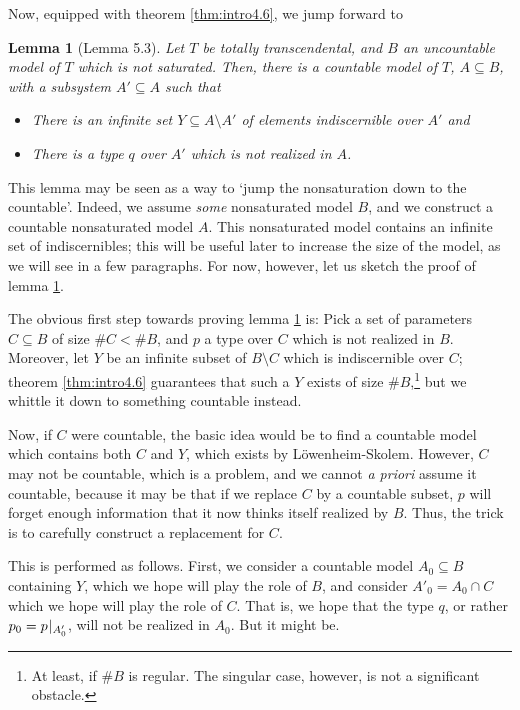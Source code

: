\documentclass{article}
\newtheorem{lemma}[theorem]{Lemma}
\theoremstyle{nonumberplain}
\newcommand{\card}[1]{\#{#1}}
\newcommand{\rst}[2]{#1\mspace{1.3mu plus 0.5mu minus 0.5mu}|_{#2}}
\begin{document}
Now, equipped with theorem \ref{thm:intro4.6}, we jump forward to
\begin{lemma}[Lemma 5.3]\label{lem:intro5.3}
Let $T$ be totally transcendental, and $B$ an uncountable model of $T$ which is not saturated. Then, there is a countable model of $T$, $A \subseteq B$, with a subsystem $A' \subseteq A$ such that
\begin{itemize}
\item There is an infinite set $Y \subseteq A \setminus A'$ of elements indiscernible over $A'$ and
\item There is a type $q$ over $A'$ which is not realized in $A$.
\end{itemize}
\end{lemma}

This lemma may be seen as a way to `jump the nonsaturation down to the countable'. Indeed, we assume \emph{some} nonsaturated model $B$, and we construct a countable nonsaturated model $A$. This nonsaturated model contains an infinite set of indiscernibles; this will be useful later to increase the size of the model, as we will see in a few paragraphs. For now, however, let us sketch the proof of lemma \ref{lem:intro5.3}.

The obvious first step towards proving lemma \ref{lem:intro5.3} is: Pick a set of parameters $C \subseteq B$ of size $\card C < \card B$, and $p$ a type over $C$ which is not realized in $B$. Moreover, let $Y$ be an infinite subset of $B \setminus C$ which is indiscernible over $C$; theorem \ref{thm:intro4.6} guarantees that such a $Y$ exists of size $\card B$,\footnote{At least, if $\card B$ is regular. The singular case, however, is not a significant obstacle.} but we whittle it down to something countable instead.

Now, if $C$ were countable, the basic idea would be to find a countable model which contains both $C$ and $Y$, which exists by Löwenheim-Skolem. However, $C$ may not be countable, which is a problem, and we cannot \textit{a priori} assume it countable, because it may be that if we replace $C$ by a countable subset, $p$ will forget enough information that it now thinks itself realized by $B$. Thus, the trick is to carefully construct a replacement for $C$.

This is performed as follows. First, we consider a countable model $A_0 \subseteq B$ containing $Y$, which we hope will play the role of $B$, and consider $A'_0 = A_0 \cap C$ which we hope will play the role of $C$. That is, we hope that the type $q$, or rather $p_0 = \rst p{A'_0}$, will not be realized in $A_0$. But it might be.
\end{document}
